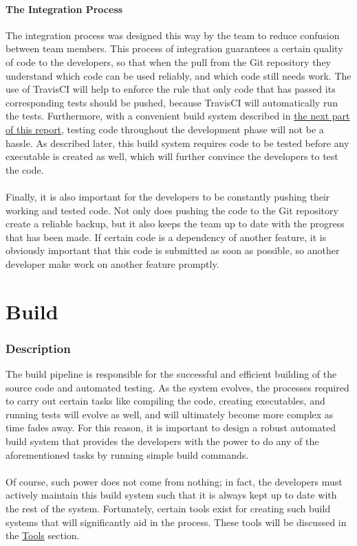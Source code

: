 \documentclass[12pt]{report}
\begin{document}
\subsection{The Integration Process}
\label{s:integrationprocessrationale}
The integration process was designed this way by the team to reduce confusion between team members.
This process of integration guarantees a certain quality of code to the developers, so that when the
pull from the Git repository they understand which code can be used reliably, and which code still
needs work. The use of TravisCI will help to enforce the rule that only code that has passed its
corresponding tests should be pushed, because TravisCI will automatically run the tests.
Furthermore, with a convenient build system described in \hyperref[p:build]{the next part of this
report}, testing code throughout the development phase will not be a hassle. As described later,
this build system requires code to be tested before any executable is created as well, which will
further convince the developers to test the code.\\\\
Finally, it is also important for the developers to be constantly pushing their working and tested
code. Not only does pushing the code to the Git repository create a reliable backup, but it also
keeps the team up to date with the progress that has been made. If certain code is a dependency of
another feature, it is obviously important that this code is submitted as soon as possible, so
another developer make work on another feature promptly.

\part{Build}
\label{p:build}
\section{Description}
The build pipeline is responsible for the successful and efficient building of the source code and
automated testing. As the system evolves, the processes required to carry out certain tasks like
compiling the code, creating executables, and running tests will evolve as well, and will ultimately
become more complex as time fades away. For this reason, it is important to design a robust automated
build system that provides the developers with the power to do any of the aforementioned tasks by
running simple build commands.\\\\
Of course, such power does not come from nothing; in fact, the developers must actively maintain
this build system such that it is always kept up to date with the rest of the system. Fortunately,
certain tools exist for creating such build systems that will significantly aid in the process.
These tools will be discussed in the \hyperref[s:build-tools]{Tools} section.
\end{document}
